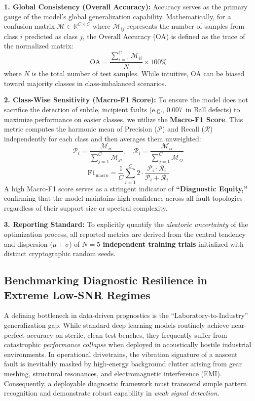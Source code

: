 \documentclass[5p,times,twocolumn]{elsarticle}
\begin{document}
\textbf{1. Global Consistency (Overall Accuracy):}
Accuracy serves as the primary gauge of the model's global generalization capability. Mathematically, for a confusion matrix $\mathcal{M} \in \mathbb{R}^{C \times C}$ where $\mathcal{M}_{ij}$ represents the number of samples from class $i$ predicted as class $j$, the Overall Accuracy (OA) is defined as the trace of the normalized matrix:
\begin{equation}
    \text{OA} = \frac{\sum_{i=1}^{C} \mathcal{M}_{ii}}{N} \times 100\%
\end{equation}
where $N$ is the total number of test samples. While intuitive, OA can be biased toward majority classes in class-imbalanced scenarios.

\textbf{2. Class-Wise Sensitivity (Macro-F1 Score):}
To ensure the model does not sacrifice the detection of subtle, incipient faults (e.g., \SI{0.007}{in} Ball defects) to maximize performance on easier classes, we utilize the \textbf{Macro-F1 Score}. This metric computes the harmonic mean of Precision ($\mathcal{P}$) and Recall ($\mathcal{R}$) independently for each class and then averages them unweighted:
\begin{equation}
    \mathcal{P}_i = \frac{\mathcal{M}_{ii}}{\sum_{j=1}^{C} \mathcal{M}_{ji}}, \quad \mathcal{R}_i = \frac{\mathcal{M}_{ii}}{\sum_{j=1}^{C} \mathcal{M}_{ij}}
\end{equation}
\begin{equation}
    \text{F1}_{\text{macro}} = \frac{1}{C} \sum_{i=1}^{C} 2 \cdot \frac{\mathcal{P}_i \cdot \mathcal{R}_i}{\mathcal{P}_i + \mathcal{R}_i}
\end{equation}
A high Macro-F1 score serves as a stringent indicator of \textbf{``Diagnostic Equity,''} confirming that the model maintains high confidence across all fault topologies regardless of their support size or spectral complexity.

\textbf{3. Reporting Standard:}
To explicitly quantify the \textit{aleatoric uncertainty} of the optimization process, all reported metrics are derived from the central tendency and dispersion ($\mu \pm \sigma$) of \textbf{$N=5$ independent training trials} initialized with distinct cryptographic random seeds.

\subsection{Benchmarking Diagnostic Resilience in Extreme Low-SNR Regimes}
A defining bottleneck in data-driven prognostics is the ``Laboratory-to-Industry'' generalization gap. While standard deep learning models routinely achieve near-perfect accuracy on sterile, clean test benches, they frequently suffer from catastrophic \textit{performance collapse} when deployed in acoustically hostile industrial environments. In operational drivetrains, the vibration signature of a nascent fault is inevitably masked by high-energy background clutter arising from gear meshing, structural resonances, and electromagnetic interference (EMI). Consequently, a deployable diagnostic framework must transcend simple pattern recognition and demonstrate robust capability in \textit{weak signal detection}.
\end{document}
